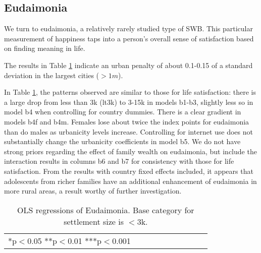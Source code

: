 \documentclass[10pt, letterpaper]{article}
\begin{document}
\begin{spacing}{1.4}
                                                       






\subsection*{Eudaimonia}

We turn to eudaimonia, a relatively rarely studied type of SWB. This particular measurement of happiness taps into a person's overall sense of satisfaction based on finding meaning in life. 

The results in Table \ref{regB} indicate an urban penalty of about 0.1-0.15 of a standard deviation in the largest cities ($>1m$).

 In Table \ref{regB}, the patterns observed are similar to those for life
 satisfaction: there is a large drop from less than 3k (lt3k) to 3-15k in models
 b1-b3, slightly less so
 in model b4 when controlling for country dummies. There is a clear gradient in
 models b4f and b4m. Females lose about twice the index points for eudaimonia
 than do males as urbanicity levels increase. 
Controlling for internet use does not substantially change  the urbanicity
coefficients in model b5. %
 We do not
have strong priors regarding the effect of family wealth on eudaimonia, but include the interaction results in
columns b6 and b7 for consistency with those for life satisfaction. From the results with country fixed effects
included, it appears that adolescents from richer families have an additional enhancement of eudaimonia in more
rural areas, a result worthy of further investigation.


\begin{table}[H]\centering\caption{OLS regressions of Eudaimonia. Base category for settlement size is $<$3k.} \label{regB} \begin{scriptsize} \begin{tabular}{p{1.6in}p{.5in}p{.5in}p{.5in}p{.5in}|p{.5in}p{.5in}|p{.5in}|p{.5in}p{.5in}p{.5 in}p{.5in}p{.5 in}}\hline  \hline\multicolumn{4}{l}{*p$<$0.05 **p$<$0.01 ***p$<$0.001} \end{tabular}\end{scriptsize}\end{table}




\end{spacing}
\end{document}
